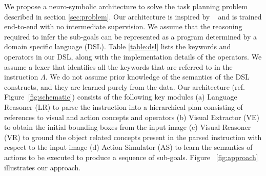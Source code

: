 We propose a neuro-symbolic architecture to solve the task planning problem described in section \ref{sec:problem}. Our architecture is inspired by ~\cite{Mao2019NeuroSymbolic} and is trained end-to-end with no intermediate supervision.
We assume that the reasoning required to infer the sub-goals can be represented as a program determined by a domain specific language (DSL). Table \ref{table:dsl} lists the keywords and operators in our DSL, along with the implementation details of the operators. We assume a lexer that identifies all the keywords that are referred to in the  instruction $\Lambda$. We do not assume prior knowledge of the semantics of the DSL constructs, and they are learned purely from the data.
 Our architecture (ref. Figure~\ref{fig:schematic}) consists of the following key modules (a) Language Reasoner (LR) to parse the instruction into a hierarchical plan consisting of references to visual and action concepts and operators (b) Visual Extractor (VE) to obtain the initial bounding boxes from the input image (c) Visual Reasoner (VR) to ground the object related concepts present in the parsed instruction with respect to the input image (d) Action Simulator (AS) to learn the semantics of actions to be executed to produce a sequence of sub-goals. Figure ~\ref{fig:approach} illustrates our approach. 

 



